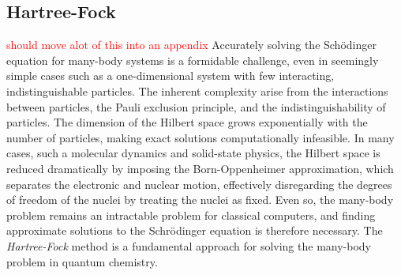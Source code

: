 \documentclass{subfiles}
\begin{document}
\subsection{Hartree-Fock}\label{app:HF_theory}\textcolor{red}{should move alot of this into an appendix}
Accurately solving the Schödinger equation for many-body systems is a formidable challenge, even in seemingly simple cases such as a one-dimensional system with few interacting, indistinguishable particles. The inherent complexity arise from the interactions between particles, the Pauli exclusion principle, and the indistinguishability of particles. The dimension of the Hilbert space grows exponentially with the number of particles, making exact solutions computationally infeasible. In many cases, such a molecular dynamics and solid-state physics, the Hilbert space is reduced dramatically by imposing the Born-Oppenheimer approximation, which separates the electronic and nuclear motion, effectively disregarding the degrees of freedom of the nuclei by treating the nuclei as fixed. Even so, the many-body problem remains an intractable problem for classical computers, and finding approximate solutions to the Schrödinger equation is therefore necessary. The \emph{Hartree-Fock} method is a fundamental approach for solving the many-body problem in quantum chemistry. \\ \\
\end{document}
